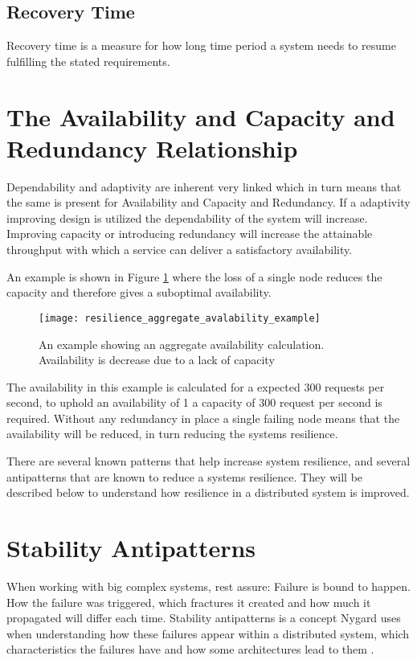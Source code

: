 \subsection{Recovery Time} 
Recovery time is a measure for how long time period a system needs to resume fulfilling the stated requirements.

\section{The Availability and Capacity and Redundancy Relationship}
Dependability and adaptivity are inherent very linked which in turn means that the same is present for Availability and Capacity and Redundancy. If a adaptivity improving design is utilized the dependability of the system will increase. Improving capacity or introducing redundancy will increase the attainable throughput with which a service can deliver a satisfactory availability.

An example is shown in Figure \ref{fig:resilience_aggregate_avalability_example} where the loss of a single node reduces the capacity and therefore gives a suboptimal availability.

\begin{figure}[!htb]
  \texttt{[image: resilience\_aggregate\_avalability\_example]}  
  \caption{An example showing an aggregate  availability calculation. Availability is decrease due to a lack of capacity}
  \label{fig:resilience_aggregate_avalability_example}
\end{figure}

The availability in this example is calculated for a expected 300 requests per second, to uphold an availability of 1 a capacity of 300 request per second is required. Without any redundancy in place a single failing node means that the availability will be reduced, in turn reducing the systems resilience. 

There are several known patterns that help increase system resilience, and several antipatterns that are known to reduce a systems resilience. They will be described below to understand how resilience in a distributed system is improved.

\section{Stability Antipatterns}
\label{sec:stability_antipatterns}
When working with big complex systems, rest assure: Failure is bound to happen. How the failure was triggered, which fractures it created and how much it propagated will differ each time. Stability antipatterns is a concept Nygard uses when understanding how these failures appear within a distributed system, which characteristics the failures have and how some architectures lead to them \cite[p. 31]{nygard2007release}.

